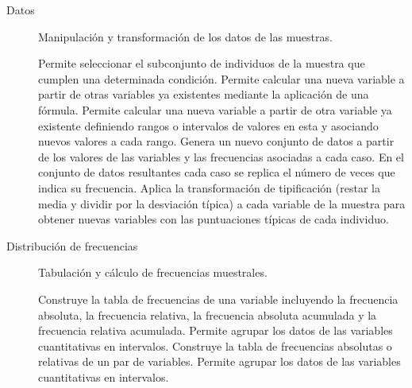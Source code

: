 \documentclass[10pt,twoside,spanish]{article}
\numberwithin{equation}{section}
\begin{document}
\begin{description}
\item[Datos] Manipulación y transformación de los datos de las muestras. 
\begin{itemize}
 Permite seleccionar el subconjunto de individuos de la muestra que cumplen una determinada condición. 
 Permite calcular una nueva variable a partir de otras variables ya existentes mediante la aplicación de una
fórmula.  
 Permite calcular una nueva variable a partir de otra variable ya existente definiendo rangos o intervalos de
valores en esta y asociando nuevos valores a cada rango.  
 Genera un nuevo conjunto de datos a partir de los valores de las variables y las frecuencias asociadas a cada caso.
En el conjunto de datos resultantes cada caso se replica el número de veces que indica su frecuencia. 
 Aplica la transformación de tipificación (restar la media y dividir por la desviación típica) a cada variable
de la muestra para obtener nuevas variables con las puntuaciones típicas de cada individuo. 
\end{itemize}

\item[Distribución de frecuencias] Tabulación y cálculo de frecuencias muestrales.
\begin{itemize}
 Construye la tabla de frecuencias de una variable incluyendo la frecuencia absoluta, la frecuencia relativa,
la frecuencia absoluta acumulada y la frecuencia relativa acumulada.
Permite agrupar los datos de las variables cuantitativas en intervalos. 
 Construye la tabla de frecuencias absolutas o relativas de un par de variables.
Permite agrupar los datos de las variables cuantitativas en intervalos. 
\end{itemize}


\end{description}
\end{document}
